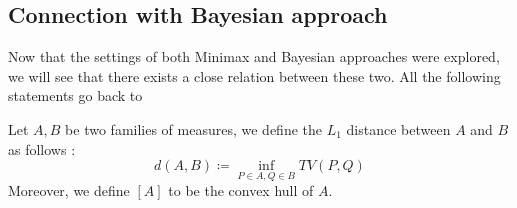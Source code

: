 \subsection{Connection with Bayesian approach}
Now that the settings of both Minimax and Bayesian approaches were explored, we will see that there exists a close relation between these two. All the following statements go back to \citet{Wald1950-WALSDF-3}
\begin{definition}
    Let $A,B$ be two families of measures, we define the $L_1$ distance between $A$ and $B$ as follows : \begin{equation*}
        d(A,B) \coloneqq \inf_{P\in A, Q \in B} TV(P,Q)
    \end{equation*}
    Moreover, we define $[A]$ to be the convex hull of $A$.
\end{definition}

